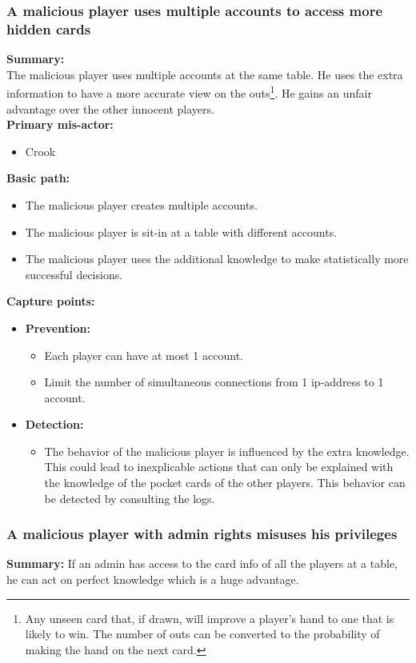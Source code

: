 \documentclass[a4paper,11pt]{report}
\begin{document}
\subsubsection{A malicious player uses multiple accounts to access more hidden cards}
\textbf{Summary:} \\
The malicious player uses multiple accounts at the same table. He uses the extra information to  have a more accurate view on the outs\footnote{Any unseen card that, if drawn, will improve a player's hand to one that is likely to win. The number of outs can be converted to the probability of making the hand on the next card.}. He gains an unfair advantage over the other innocent players. \\
\textbf{Primary mis-actor:}
\begin{itemize}
\item Crook
\end{itemize}
\textbf{Basic path:}
\begin{itemize}
\item The malicious player creates multiple accounts.
\item The malicious player is sit-in at a table with different accounts.
\item The malicious player uses the additional knowledge to make statistically more successful decisions.
\end{itemize}
\textbf{Capture points:}
\begin{itemize}
\item \textbf{Prevention:}
\begin{itemize}
\item Each player can have at most 1 account.
\item Limit the number of simultaneous connections from 1 ip-address to 1 account.
\end{itemize}
\item \textbf{Detection:}
\begin{itemize}
\item The behavior of the malicious player is influenced by the extra knowledge. This could lead to inexplicable actions that can only be explained with the knowledge of the pocket cards of the other players. This behavior can be detected by consulting the logs.
\end{itemize}
\end{itemize}
\subsubsection{A malicious player with admin rights misuses his privileges}
\textbf{Summary:} If an admin has access to the card info of all the players at a table, he can act on perfect knowledge which is a huge advantage.
\end{document}
